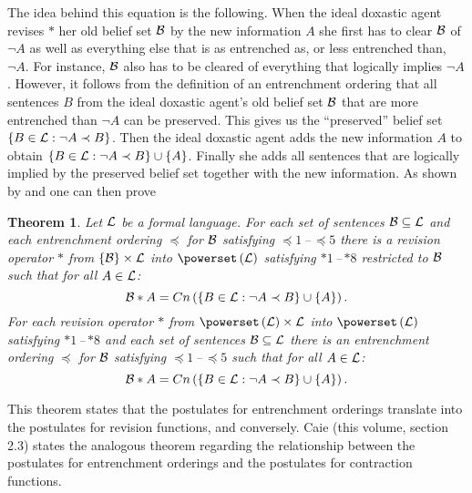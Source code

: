 The idea behind this equation is the following. When the ideal doxastic agent revises $*$ her old belief set $\cal B$ by the new information $A$ she first has to clear $\cal B$ of $\neg A$ as well as everything else that is as entrenched as, or less entrenched than, $\neg A$. For instance, $\cal B$ also has to be cleared of everything that logically implies $\neg A$. However, it follows from the definition of an entrenchment ordering that all sentences $B$ from the ideal doxastic agent's old belief set $\cal B$ that are more entrenched than $\neg A$ can be preserved. This gives us the ``preserved'' belief set $\left\{B\in\begin{cal}L\end{cal}:\neg A\prec B\right\}$. Then the ideal doxastic agent adds the new information $A$ to obtain $\left\{B\in\begin{cal}L\end{cal}:\neg A\prec B\right\}\cup\left\{A\right\}$. Finally she adds all sentences that are logically implied by the preserved belief set together with the new information. As shown by \citet{g88b} and \citet{gm88} one can then prove
\newtheorem{theorem}{Theorem}
\begin{theorem}\label{th1}
Let $\cal L$ be a formal language. For each set of sentences $\cal B\subseteq L$ and each entrenchment ordering $\preceq$ for $\cal B$ satisfying $\preceq \!\! 1$\,--\,$\preceq \!\! 5$ there is a revision operator $*$ from $\left\{\cal B\right\}\times\cal L$ into $\powerset\left(\cal L\right)$ satisfying $*1$\,--\,$*8$ restricted to $\cal B$ such that for all $A\in\cal L$:
$$\begin{cal}B\end{cal}*A=Cn\left(\left\{B\in\begin{cal}L\end{cal}:\neg A\prec B\right\}\cup\left\{A\right\}\right).$$
For each revision operator $*$ from $\powerset\left(\cal L\right)\times\cal L$ into $\powerset\left(\cal L\right)$ satisfying $*1$\,--\,$*8$ and each set of sentences $\cal B\subseteq L$ there is an entrenchment ordering $\preceq$ for $\cal B$ satisfying $\preceq \! 1$\,--\,$\preceq \! 5$ such that for all $A\in\cal L$:
$$\begin{cal}B\end{cal}*A=Cn\left(\left\{B\in\begin{cal}L\end{cal}:\neg A\prec B\right\}\cup\left\{A\right\}\right).$$
\end{theorem}
This theorem states that the postulates for entrenchment orderings translate into the postulates for revision functions, and conversely. Caie (this volume, section 2.3) states the analogous theorem regarding the relationship between the postulates for entrenchment orderings and the postulates for contraction functions.

